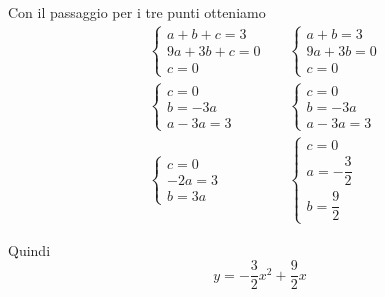 Con il passaggio per i tre punti otteniamo
\begin{align*}
&\begin{cases}
a+b+c=3\\9a+3b+c=0\\c=0
\end{cases}
&&\begin{cases}
a+b=3\\9a+3b=0\\c=0
\end{cases}\\
&\begin{cases}
c=0\\b=-3a\\a-3a=3
\end{cases}
&&\begin{cases}
c=0\\b=-3a\\a-3a=3
\end{cases}\\
&\begin{cases}
c=0\\-2a=3\\b=3a
\end{cases}
&&\begin{cases}
c=0\\a=-\dfrac{3}{2}\\b=\dfrac{9}{2}
\end{cases}
\end{align*}
\begin{center}
	
	\label{fig:disegnoparabola9}
\end{center}
Quindi \[y=-\dfrac{3}{2}x^2+ \dfrac{9}{2}x\]
